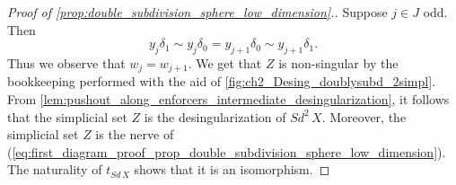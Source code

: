\begin{proof}[Proof of \cref{prop:double_subdivision_sphere_low_dimension}.]
Suppose $j\in J$ odd. Then
\[y_j\delta _1\sim y_j\delta _0=y_{j+1}\delta _0\sim y_{j+1}\delta _1.\]
Thus we observe that $w_j=w_{j+1}$. We get that $Z$ is non-singular by the bookkeeping performed with the aid of \cref{fig:ch2_Desing_doublysubd_2simpl}. From \cref{lem:pushout_along_enforcers_intermediate_desingularization}, it follows that the simplicial set $Z$ is the desingularization of $Sd^2\, X$. Moreover, the simplicial set $Z$ is the nerve of (\ref{eq:first_diagram_proof_prop_double_subdivision_sphere_low_dimension}). The naturality of $t_{Sd\, X}$ shows that it is an isomorphism.
\end{proof}

























